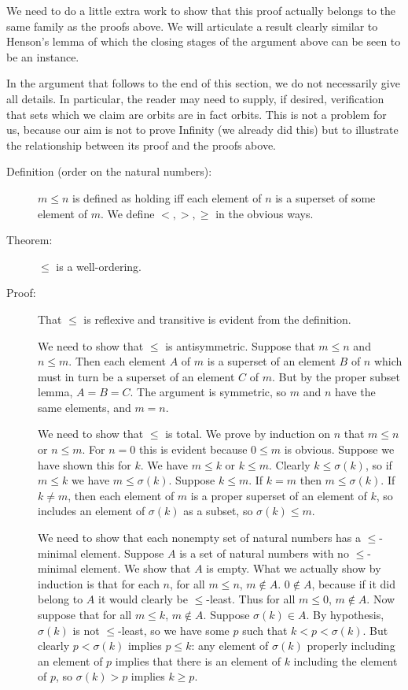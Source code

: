 \documentclass[12pt]{article}
\begin{document}
We need to do a little extra work to show that this proof actually belongs to the same family as the proofs above.  We will articulate a result clearly similar to Henson's lemma of which the closing stages of the argument above can be seen to be an instance.

In the argument that follows to the end of this section, we do not necessarily give all details.  In particular, the reader may need to supply, if desired, verification that sets which we claim are orbits are in fact orbits.  This is not a problem for us, because our aim is not to prove Infinity (we already did this) but to illustrate the relationship between its proof and the proofs above.

\begin{description}

\item[Definition (order on the natural numbers):]  $m \leq n$ is defined as holding iff each element of $n$ is a superset of some element of $m$.   We define $<, >, \geq$ in the obvious ways.

\item[Theorem:]  $\leq$ is a well-ordering.

\item[Proof:]  That $\leq$ is reflexive and transitive is evident from the definition.

We need to show that $\leq$ is antisymmetric.  Suppose that $m \leq n$ and $n \leq m$.  Then each element $A$ of $m$
is a superset of an element $B$ of $n$ which must in turn be a superset of an element $C$ of $m$.  But by the proper subset
lemma, $A=B=C$.  The argument is symmetric, so $m$ and $n$ have the same elements, and $m=n$.

We need to show that $\leq$ is total.  We prove by induction on $n$ that $m \leq n$ or $n\leq m$.  For $n=0$ this is evident because $0 \leq m$ is obvious.  Suppose we have shown this for $k$.  We have $m \leq k$ or $k \leq m$.  Clearly
$k \leq \sigma(k)$, so if $m \leq k$ we have $m \leq \sigma(k)$.  Suppose $k \leq m$.  If $k=m$ then $m \leq \sigma(k)$.
If $k \neq m$, then each element of $m$ is a proper superset of an element of $k$, so includes an element of $\sigma(k)$ as a subset, so $\sigma(k) \leq m$.

We need to show that each nonempty set of natural numbers has a $\leq$-minimal element.  Suppose $A$ is a set of natural
numbers with no $\leq$-minimal element.  We show that $A$ is empty.  What we actually show by induction is that for each
$n$, for all $m \leq n$, $m \not\in A$.  $0 \not\in A$, because if it did belong to $A$ it would clearly be $\leq$-least.
Thus for all $m \leq 0$, $m\not\in A$.  Now suppose that for all $m \leq k$, $m \not\in A$.   Suppose $\sigma(k) \in A$.
By hypothesis, $\sigma(k)$ is not $\leq$-least, so we have some $p$ such that $k < p < \sigma(k)$.  But clearly $p<\sigma(k)$ implies $p \leq k$:  any element of $\sigma(k)$ properly including an element of $p$ implies that there is an element of $k$ including the element of $p$, so $\sigma(k)>p$ implies $k \geq p$.


\end{description}
\end{document}
